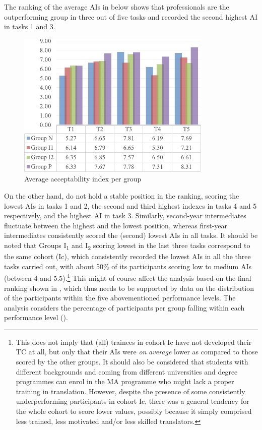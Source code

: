 \documentclass[output=paper]{LSP/langsci}
\begin{document}
The ranking of the average AIs in  below shows that professionals are the outperforming group in three out of five tasks and recorded the second highest AI in tasks 1 and 3.

\begin{figure}
 \includegraphics[width=.4\textwidth]{figures/quinci/figure7.pdf}
 \caption{Average acceptability index per group}
 \label{quinci:fig:7}
\end{figure}

On the other hand,  do not hold a stable position in the ranking, scoring the lowest AIs in tasks 1 and 2, the second and third highest indexes in tasks 4 and 5 respectively, and the highest AI in task 3. Similarly, second-year intermediates fluctuate between the highest and the lowest position, whereas first-year intermediates consistently scored the (second) lowest AIs in all tasks. It should be noted that Groups I\textsubscript{1} and I\textsubscript{2} scoring lowest in the last three tasks correspond to the same cohort (Ic), which consistently recorded the lowest AIs in all the three tasks carried out, with about 50\% of its participants scoring low to medium AIs (between 4 and 5.5).\footnote{This does not imply that (all) trainees in cohort Ic have not developed their TC at all, but only that their AIs were \textit{on} \textit{average} lower as compared to those scored by the other groups. It should also be considered that students with different backgrounds and coming from different universities and degree programmes can enrol in the MA programme who might lack a proper training in translation. However, despite the presence of some consistently underperforming participants in cohort Ic, there was a general tendency for the whole cohort to score lower values, possibly because it simply comprised less trained, less motivated and/or less skilled translators.} This might of course affect the analysis based on the final ranking shown in , which thus needs to be supported by data on the distribution of the participants within the five abovementioned performance levels. The analysis considers the percentage of participants per group falling within each performance level ().
\end{document}
